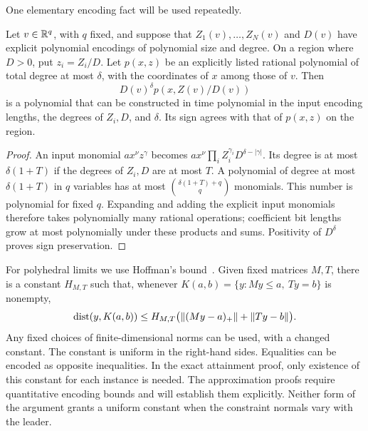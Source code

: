 One elementary encoding fact will be used repeatedly.
\begin{lemma}\label{lem:substitution}
Let $v\in\mathbb R^q$, with $q$ fixed, and suppose that $Z_1(v),\ldots,Z_N(v)$
and $D(v)$ have explicit polynomial encodings of polynomial size and degree.
On a region where $D>0$, put $z_i=Z_i/D$. Let $p(x,z)$ be an explicitly
listed rational polynomial of total degree at most $\delta$, with the
coordinates of $x$ among those of $v$. Then
\[
             D(v)^\delta p(x,Z(v)/D(v))
\]
is a polynomial that can be constructed in time polynomial in the input
encoding lengths, the degrees of $Z_i,D$, and $\delta$. Its sign agrees
with that of $p(x,z)$ on the region.
\end{lemma}
\begin{proof}
An input monomial $a x^\nu z^\gamma$ becomes
$a x^\nu\prod_iZ_i^{\gamma_i}D^{\delta-|\gamma|}$.
Its degree is at most $\delta(1+T)$ if the degrees of $Z_i,D$ are at
most $T$. A polynomial of degree at most $\delta(1+T)$ in $q$ variables
has at most $\binom{\delta(1+T)+q}{q}$ monomials. This number is
polynomial for fixed $q$. Expanding and adding the explicit input
monomials therefore takes polynomially many rational operations;
coefficient bit lengths grow at most polynomially under these products
and sums. Positivity of $D^\delta$ proves sign preservation.
\end{proof}

For polyhedral limits we use Hoffman's bound~\cite{Hoffman1952}.
Given fixed matrices $M,T$, there is a constant $H_{M,T}$ such that,
whenever $K(a,b)=\{y:My\le a,\ Ty=b\}$ is nonempty,
\begin{equation}\label{eq:hoffman}
 \operatorname{dist}(y,K(a,b))\le H_{M,T}
          \bigl(\left\lVert(My-a)_+\right\rVert+\left\lVert Ty-b\right\rVert\bigr).
\end{equation}
Any fixed choices of finite-dimensional norms can be used, with a changed
constant. The constant is uniform in the right-hand sides. Equalities
can be encoded as opposite inequalities. In the exact attainment proof,
only existence of this constant for each instance is needed. The
approximation proofs require quantitative encoding bounds and will
establish them explicitly. Neither form of the argument grants a uniform
constant when the constraint normals vary with the leader.
